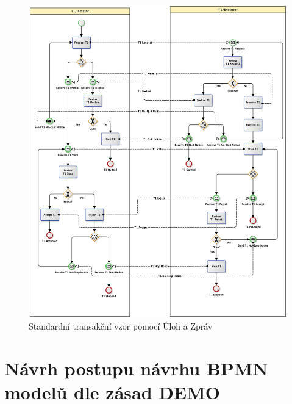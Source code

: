 \documentclass[]{article}
\begin{document}
\begin{figure}[H]\centering
\includegraphics[width=1.3\textwidth,height=1.3\textheight,keepaspectratio]{obrazky/transaction-standard-messages}
\caption{Standardní transakční vzor pomocí Úloh a Zpráv}
\label{fig:St_trans_ulohy_zpravy}
\end{figure}

\section{Návrh postupu návrhu BPMN modelů dle zásad DEMO}

\nocite{*}


\end{document}
